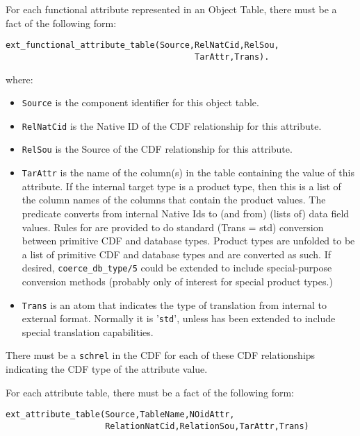 For each functional attribute represented in an Object Table, there
must be a fact of the following form:

\begin{verbatim}
ext_functional_attribute_table(Source,RelNatCid,RelSou,
                                      TarAttr,Trans).
\end{verbatim}

where:

\begin{itemize}
\item
{\tt Source} is the component identifier for this object table.
\item
{\tt RelNatCid} is the Native ID of the CDF relationship for this
attribute.
\item
{\tt RelSou} is the Source of the CDF relationship for this attribute.
\item
{\tt TarAttr} is the name of the column(s) in the table containing the
value of this attribute.  If the internal target type is a product
type, then this is a list of the column names of the columns that
contain the product values.  The predicate 
converts from internal Native Ids to (and from) (lists of) data field
values.  Rules for  are provided to do standard
(Trans = std) conversion between primitive CDF and database types.
Product types are unfolded to be a list of primitive CDF and database
types and are converted as such.  If desired, {\tt coerce\_db\_type/5}
could be extended to include special-purpose conversion methods
(probably only of interest for special product types.)
\item
{\tt Trans} is an atom that indicates the type of translation from
internal to external format.  Normally it is '{\tt std}', unless
 has been extended to include special
translation capabilities.  \end{itemize}

There must be a {\tt schrel} in the CDF for each of these CDF
relationships indicating the CDF type of the attribute value.

For each attribute table, there must be a fact of the following form:

\begin{verbatim}
ext_attribute_table(Source,TableName,NOidAttr,
                    RelationNatCid,RelationSou,TarAttr,Trans)
\end{verbatim}

